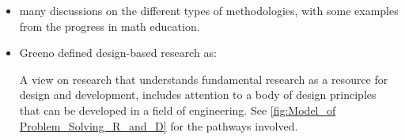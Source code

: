 \documentclass{TC}
\begin{document}
\begin{itemize}
\item many discussions on the different types of methodologies, with some examples from the progress in math education.
\item Greeno defined design-based research as:

\begin{definition}
A view on research that understands fundamental research as a resource for design and development, includes attention to a body of design principles that can be developed in a field of engineering. See  \autoref{fig:Model_of Problem_Solving_R_and_D} for the pathways involved.
\end{definition}
\end{itemize}
\end{document}
